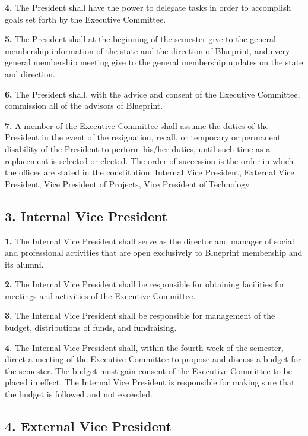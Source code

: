 \documentclass{article}
\begin{document}
\textbf{4.} The President shall have the power to delegate tasks in order to accomplish goals set forth by the Executive Committee.

\textbf{5.} The President shall at the beginning of the semester give to the general membership information of the state and the direction of Blueprint, and every general membership meeting give to the general membership updates on the state and direction.

\textbf{6.} The President shall, with the advice and consent of the Executive Committee, commission all of the advisors of Blueprint.

\textbf{7.} A member of the Executive Committee shall assume the duties of the President in the event of the resignation, recall, or temporary or permanent disability of the President to perform his/her duties, until such time as a replacement is selected or elected. The order of succession is the order in which the offices are stated in the constitution: Internal Vice President, External Vice President, Vice President of Projects, Vice President of Technology. 

\subsection{3. Internal Vice President}

\textbf{1.} The Internal Vice President shall serve as the director and manager of social and professional activities that are open exclusively to Blueprint membership and its alumni.

\textbf{2.} The Internal Vice President shall be responsible for obtaining facilities for meetings and activities of the Executive Committee.

\textbf{3.} The Internal Vice President shall be responsible for management of the budget, distributions of funds, and fundraising.

\textbf{4.} The Internal Vice President shall, within the fourth week of the semester, direct a meeting of the Executive Committee to propose and discuss a budget for the semester. The budget must gain consent of the Executive Committee to be placed in effect. The Internal Vice President is responsible for making sure that the budget is followed and not exceeded.

\subsection{4. External Vice President}
\end{document}
